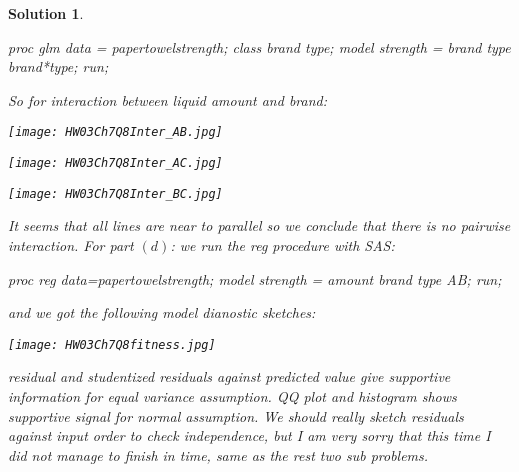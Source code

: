 \documentclass[11pt]{article}
\newtheorem{sol}{Solution}
\begin{document}
\begin{sol}
\begin{Datastep}
proc glm data = papertowelstrength;
	class brand type;
	model strength = brand type brand*type;
run;
	\end{Datastep}
	So for interaction between liquid amount and brand:
	\begin{center}
		\texttt{[image: HW03Ch7Q8Inter\_AB.jpg]}
	\end{center}
	\begin{center}
		\texttt{[image: HW03Ch7Q8Inter\_AC.jpg]}
	\end{center}
	\begin{center}
		\texttt{[image: HW03Ch7Q8Inter\_BC.jpg]}
	\end{center}
	It seems that all lines are near to parallel so we conclude that there is no pairwise interaction.\vskip 2mm
	For part $(d)$:\vskip 2mm
	we run the reg procedure with SAS:
	\begin{Datastep}
		proc reg data=papertowelstrength;
	model strength = amount brand type AB;
run;
	\end{Datastep}
	and we got the following model dianostic sketches:
	\begin{center}
		\texttt{[image: HW03Ch7Q8fitness.jpg]}
	\end{center}
	residual and studentized residuals against predicted value give supportive information for equal variance assumption. QQ plot and histogram shows supportive signal for normal assumption.\vskip 2mm
	We should really sketch residuals against input order to check independence, but I am very sorry that this time I did not manage to finish in time, same as the rest two sub problems.
\end{sol}
\end{document}
